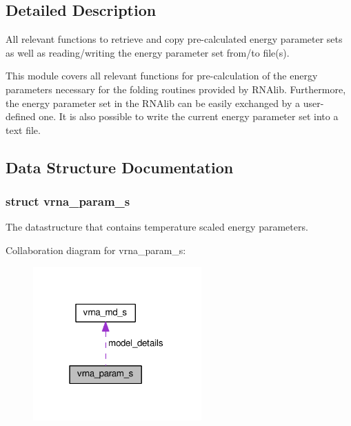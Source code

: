\subsection{Detailed Description}
All relevant functions to retrieve and copy pre-\/calculated energy parameter sets as well as reading/writing the energy parameter set from/to file(s). 

This module covers all relevant functions for pre-\/calculation of the energy parameters necessary for the folding routines provided by R\+N\+Alib. Furthermore, the energy parameter set in the R\+N\+Alib can be easily exchanged by a user-\/defined one. It is also possible to write the current energy parameter set into a text file. 

\subsection{Data Structure Documentation}
\label{structvrna__param__s}
\hypertarget{group__energy__parameters_structvrna__param__s}{}
\subsubsection{struct vrna\+\_\+param\+\_\+s}
The datastructure that contains temperature scaled energy parameters. 

Collaboration diagram for vrna\+\_\+param\+\_\+s\+:
\nopagebreak
\begin{figure}[H]
\begin{center}
\leavevmode
\includegraphics[width=183pt]{structvrna__param__s__coll__graph}
\end{center}
\end{figure}
